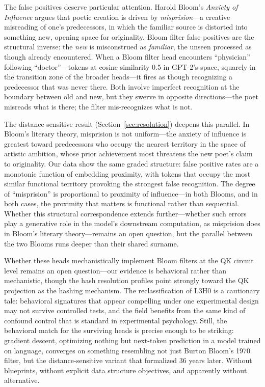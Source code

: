 \documentclass[11pt]{article}
\begin{document}
The false positives deserve particular attention. Harold Bloom's \emph{Anxiety of Influence} \citep{bloom1973anxiety} argues that poetic creation is driven by \emph{misprision}---a creative misreading of one's predecessors, in which the familiar source is distorted into something new, opening space for originality. Bloom filter false positives are the structural inverse: the \emph{new} is misconstrued as \emph{familiar}, the unseen processed as though already encountered. When a Bloom filter head encounters ``physician'' following ``doctor''---tokens at cosine similarity 0.5 in GPT-2's space, squarely in the transition zone of the broader heads---it fires as though recognizing a predecessor that was never there. Both involve imperfect recognition at the boundary between old and new, but they swerve in opposite directions---the poet misreads what is there; the filter mis-recognizes what is not.

The distance-sensitive result (Section~\ref{sec:resolution}) deepens this parallel. In Bloom's literary theory, misprision is not uniform---the anxiety of influence is greatest toward predecessors who occupy the nearest territory in the space of artistic ambition, whose prior achievement most threatens the new poet's claim to originality. Our data show the same graded structure: false positive rates are a monotonic function of embedding proximity, with tokens that occupy the most similar functional territory provoking the strongest false recognition. The degree of ``misprision'' is proportional to proximity of influence---in both Blooms, and in both cases, the proximity that matters is functional rather than sequential. Whether this structural correspondence extends further---whether such errors play a generative role in the model's downstream computation, as misprision does in Bloom's literary theory---remains an open question, but the parallel between the two Blooms runs deeper than their shared surname.

Whether these heads mechanistically implement Bloom filters at the QK circuit level remains an open question---our evidence is behavioral rather than mechanistic, though the hash resolution profiles point strongly toward the QK projection as the hashing mechanism. The reclassification of L3H0 is a cautionary tale: behavioral signatures that appear compelling under one experimental design may not survive controlled tests, and the field benefits from the same kind of confound control that is standard in experimental psychology. Still, the behavioral match for the surviving heads is precise enough to be striking: gradient descent, optimizing nothing but next-token prediction in a model trained on language, converges on something resembling not just Burton Bloom's 1970 filter, but the distance-sensitive variant that \citet{kirsch2006distance} formalized 36 years later. Without blueprints, without explicit data structure objectives, and apparently without alternative.
\end{document}
